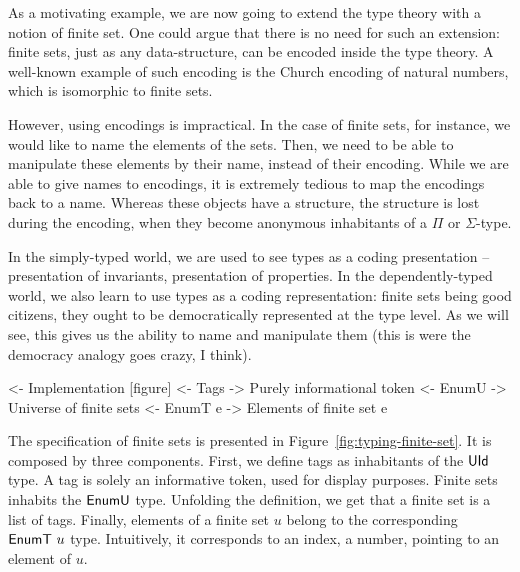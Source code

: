 As a motivating example, we are now going to extend the type theory
with a notion of finite set. One could argue that there is no need for
such an extension: finite sets, just as any data-structure, can be
encoded inside the type theory. A well-known example of such encoding
is the Church encoding of natural numbers, which is isomorphic to
finite sets. 



However, using encodings is impractical. In the case of finite sets,
for instance, we would like to name the elements of the sets. Then, we
need to be able to manipulate these elements by their name, instead of
their encoding. While we are able to give names to encodings, it is
extremely tedious to map the encodings back to a name. Whereas these
objects have a structure, the structure is lost during the encoding,
when they become anonymous inhabitants of a $\Pi$ or $\Sigma$-type.

In the simply-typed world, we are used to see types as a coding
presentation -- presentation of invariants, presentation of
properties. In the dependently-typed world, we also learn to use types
as a coding representation: finite sets being good citizens, they
ought to be democratically represented at the type level. As we will
see, this gives us the ability to name and manipulate them (this is
were the democracy analogy goes crazy, I think).


\begin{wstructure}
<- Implementation [figure]      
    <- Tags
        -> Purely informational token
    <- EnumU
        -> Universe of finite sets
    <- EnumT e
        -> Elements of finite set e
\end{wstructure}

The specification of finite sets is presented in
Figure~\ref{fig:typing-finite-set}. It is composed by three
components. First, we define tags as inhabitants of the $\UId$ type. A
tag is solely an informative token, used for display purposes. Finite
sets inhabits the $\EnumU$ type. Unfolding the definition, we get that
a finite set is a list of tags. Finally, elements of a finite set $u$
belong to the corresponding $\EnumT{u}$ type. Intuitively, it
corresponds to an index, a number, pointing to an element of $u$.

